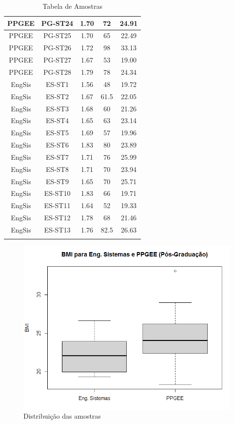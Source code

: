 \documentclass[12pt, a4paper]{article}
\begin{document}
\begin{longtable}{|c|c|c|c|c|}
\rule[-1.0ex]{0pt}{4.0ex}
PPGEE&PG-ST24&1.70&72&24.91 \\ \hline
\rule[-1.0ex]{0pt}{4.0ex}
PPGEE&PG-ST25&1.70&65&22.49 \\ \hline
\rule[-1.0ex]{0pt}{4.0ex}
PPGEE&PG-ST26&1.72&98&33.13 \\ \hline
\rule[-1.0ex]{0pt}{4.0ex}
PPGEE&PG-ST27&1.67&53&19.00 \\ \hline
\rule[-1.0ex]{0pt}{4.0ex}
PPGEE&PG-ST28&1.79&78&24.34 \\ \hline
\rule[-1.0ex]{0pt}{4.0ex}
EngSis&ES-ST1&1.56&48&19.72 \\ \hline
\rule[-1.0ex]{0pt}{4.0ex}
EngSis&ES-ST2&1.67&61.5&22.05 \\ \hline
\rule[-1.0ex]{0pt}{4.0ex}
EngSis&ES-ST3&1.68&60&21.26 \\ \hline
\rule[-1.0ex]{0pt}{4.0ex}
EngSis&ES-ST4&1.65&63&23.14 \\ \hline
\rule[-1.0ex]{0pt}{4.0ex}
EngSis&ES-ST5&1.69&57&19.96 \\ \hline
\rule[-1.0ex]{0pt}{4.0ex}
EngSis&ES-ST6&1.83&80&23.89 \\ \hline
\rule[-1.0ex]{0pt}{4.0ex}
EngSis&ES-ST7&1.71&76&25.99 \\ \hline
\rule[-1.0ex]{0pt}{4.0ex}
EngSis&ES-ST8&1.71&70&23.94 \\ \hline
\rule[-1.0ex]{0pt}{4.0ex}
EngSis&ES-ST9&1.65&70&25.71 \\ \hline
\rule[-1.0ex]{0pt}{4.0ex}
EngSis&ES-ST10&1.83&66&19.71 \\ \hline
\rule[-1.0ex]{0pt}{4.0ex}
EngSis&ES-ST11&1.64&52&19.33 \\ \hline
\rule[-1.0ex]{0pt}{4.0ex}
EngSis&ES-ST12&1.78&68&21.46 \\ \hline
\rule[-1.0ex]{0pt}{4.0ex}
EngSis&ES-ST13&1.76&82.5&26.63 \\ \hline
\caption{Tabela de Amostras}
\label{table:amostra}
\end{longtable}
\begin{figure}[h]
\centering
\includegraphics[scale=0.6]{img/boxplot.png}
\caption{Distribuição das amostras}
\label{fig:blocos}
\end{figure}
\end{document}
